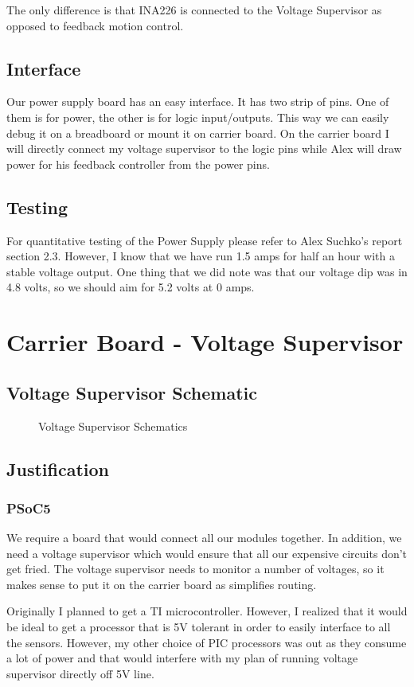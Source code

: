 \documentclass[12pt]{article}
\newcommand{\figuremine}[2]{
\begin{figure}[H]
\noindent\makebox[\textwidth]{
 \texttt{[image: \#1]}}
 \caption{#2}
\end{figure}
}
\begin{document}
The only difference is that INA226 is connected to the Voltage Supervisor as opposed to feedback motion control.

\subsection{Interface}
Our power supply board has an easy interface. It has two strip of pins. One of them is for power, the other is for logic input/outputs. This way we can easily debug it on a breadboard or mount it on carrier board. On the carrier board I will directly connect my voltage supervisor to the logic pins while Alex will draw power for his feedback controller from the power pins.
\subsection{Testing}
For quantitative testing of the Power Supply please refer to Alex Suchko's report section 2.3. However, I know that we have run 1.5 amps for half an hour with a stable voltage output. One thing that we did note was that our voltage dip was in 4.8 volts, so we should aim for 5.2 volts at 0 amps.

\section{Carrier Board - Voltage Supervisor}
\subsection{Voltage Supervisor Schematic}
\figuremine{~/ece445/Chalk-Bot/Hardware/Carrier/page1.png}{Voltage Supervisor Schematics}
\subsection{Justification}
\subsubsection{PSoC5}
We require a board that would connect all our modules together. In addition, we need a voltage supervisor which would ensure that all our expensive circuits don't get fried. The voltage supervisor needs to monitor a number of voltages, so it makes sense to put it on the carrier board as simplifies routing.

Originally I planned to get a TI microcontroller. However, I realized that it would be ideal to get a processor that is 5V tolerant in order to easily interface to all the sensors. However, my other choice of PIC processors was out as they consume a lot of power and that would interfere with my plan of running voltage supervisor directly off 5V line. 
\end{document}
